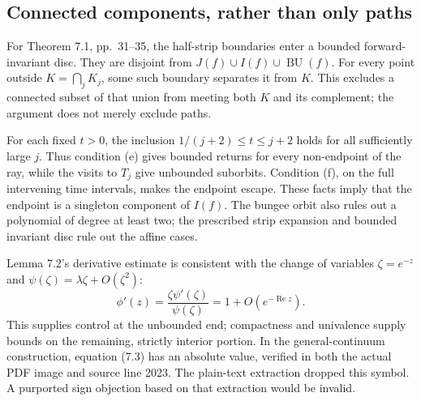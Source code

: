 \documentclass[10pt]{article}
\begin{document}
\subsection*{Connected components, rather than only paths}
For Theorem 7.1, pp. 31–35, the half-strip boundaries enter a bounded forward-invariant disc. They are disjoint from \(J(f)\cup I(f)\cup\operatorname{BU}(f)\). For every point outside \(K=\bigcap_jK_j\), some such boundary separates it from \(K\). This excludes a connected subset of that union from meeting both \(K\) and its complement; the argument does not merely exclude paths.\par
For each fixed \(t>0\), the inclusion \(1/(j+2)\leq t\leq j+2\) holds for all sufficiently large \(j\). Thus condition (e) gives bounded returns for every non-endpoint of the ray, while the visits to \(T_j\) give unbounded suborbits. Condition (f), on the full intervening time intervals, makes the endpoint escape. These facts imply that the endpoint is a singleton component of \(I(f)\). The bungee orbit also rules out a polynomial of degree at least two; the prescribed strip expansion and bounded invariant disc rule out the affine cases.\par
Lemma 7.2’s derivative estimate is consistent with the change of variables \(\zeta=e^{-z}\) and \(\psi(\zeta)=\lambda\zeta+O(\zeta^2)\): \[\phi'(z)=\frac{\zeta\psi'(\zeta)}{\psi(\zeta)}
          =1+O(e^{-\operatorname{Re}z}).\] This supplies control at the unbounded end; compactness and univalence supply bounds on the remaining, strictly interior portion. In the general-continuum construction, equation (7.3) has an absolute value, verified in both the actual PDF image and source line 2023. The plain-text extraction dropped this symbol. A purported sign objection based on that extraction would be invalid.\par
\end{document}
